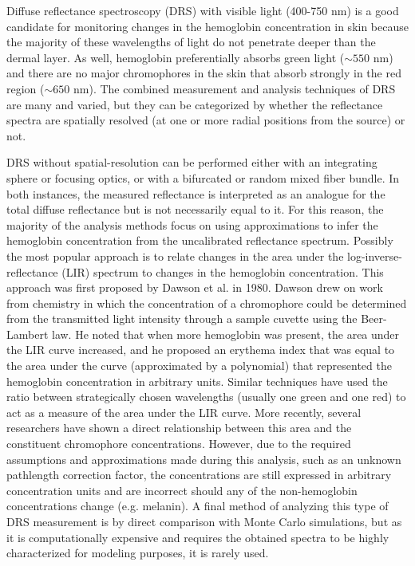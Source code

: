 Diffuse reflectance spectroscopy (DRS) with visible light (400-750 nm) is a good candidate for monitoring changes in the hemoglobin concentration in skin because the majority of these wavelengths of light do not penetrate deeper than the dermal layer.\cite{Richards-Kortum1996} As well, hemoglobin preferentially absorbs green light ($\sim550$ nm) and there are no major chromophores in the skin that absorb strongly in the red region ($\sim650$ nm).\cite{Prahl2001} The combined measurement and analysis techniques of DRS are many and varied,\cite{Palmer2006} but they can be categorized by whether the reflectance spectra are spatially resolved (at one or more radial positions from the source) or not.

DRS without spatial-resolution can be performed either with an integrating sphere or focusing optics, or with a bifurcated or random mixed fiber bundle.\cite{Stamatas2004} In both instances, the measured reflectance is interpreted as an analogue for the total diffuse reflectance but is not necessarily equal to it. For this reason, the majority of the analysis methods focus on using approximations to infer the hemoglobin concentration from the uncalibrated reflectance spectrum. Possibly the most popular approach is to relate changes in the area under the log-inverse-reflectance (LIR) spectrum to changes in the hemoglobin concentration. This approach was first proposed by Dawson et al. in 1980.\cite{Dawson1980} Dawson drew on work from chemistry in which the concentration of a chromophore could be determined from the transmitted light intensity through a sample cuvette using the Beer-Lambert law. He noted that when more hemoglobin was present, the area under the LIR curve increased, and he proposed an erythema index that was equal to the area under the curve (approximated by a polynomial) that represented the hemoglobin concentration in arbitrary units. Similar techniques have used the ratio between strategically chosen wavelengths (usually one green and one red) to act as a measure of the area under the LIR curve.\cite{Diffey1984,Lock-Andersen1998,Bodekaer2013} More recently, several researchers have shown a direct relationship between this area and the constituent chromophore concentrations.\cite{Stamatas2008,Kollias2010} However, due to the required assumptions and approximations made during this analysis, such as an unknown pathlength correction factor, the concentrations are still expressed in arbitrary concentration units and are incorrect should any of the non-hemoglobin concentrations change (e.g. melanin). A final method of analyzing this type of DRS measurement is by direct comparison with Monte Carlo simulations,\cite{Meglinski2002,Yu2008} but as it is computationally expensive and requires the obtained spectra to be highly characterized for modeling purposes, it is rarely used.

